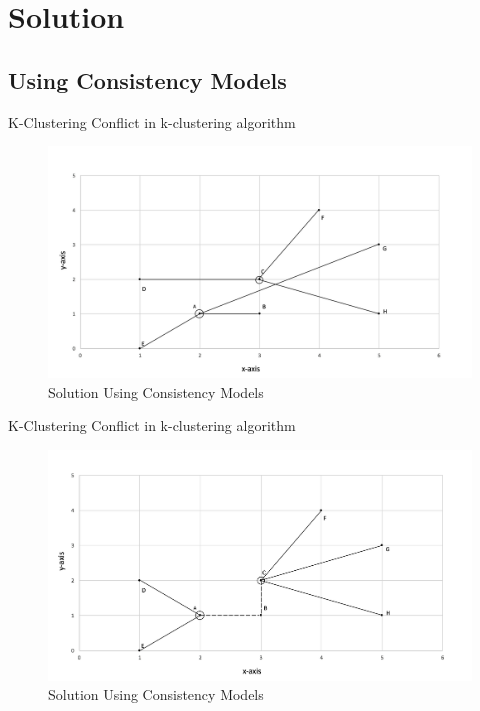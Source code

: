 \section{Solution}
\subsection{Using Consistency Models}
\begin{frame}{K-Clustering}
	Conflict in k-clustering algorithm
			\begin{figure}
			\includegraphics[width=0.8\linewidth]{figures/kcluster1.jpg}
			\caption{Solution Using Consistency Models}
			\end{figure}
\end{frame}

\begin{frame}{K-Clustering}
	Conflict in k-clustering algorithm
			\begin{figure}
			\includegraphics[width=0.8\linewidth]{figures/kcluster2.jpg}
			\caption{Solution Using Consistency Models}
			\end{figure}
\end{frame}
